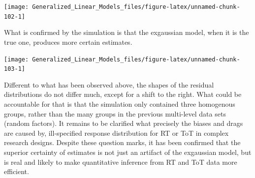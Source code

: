 \documentclass[]{svmono}
\newenvironment{Shaded}{\begin{snugshade}}{\end{snugshade}}
\newcommand{\KeywordTok}[1]{\textcolor[rgb]{0.13,0.29,0.53}{\textbf{#1}}}
\newcommand{\DataTypeTok}[1]{\textcolor[rgb]{0.13,0.29,0.53}{#1}}
\newcommand{\DecValTok}[1]{\textcolor[rgb]{0.00,0.00,0.81}{#1}}
\newcommand{\StringTok}[1]{\textcolor[rgb]{0.31,0.60,0.02}{#1}}
\newcommand{\OperatorTok}[1]{\textcolor[rgb]{0.81,0.36,0.00}{\textbf{#1}}}
\newcommand{\NormalTok}[1]{#1}
\begin{document}
\begin{Shaded}
\end{Shaded}

\texttt{[image: Generalized\_Linear\_Models\_files/figure-latex/unnamed-chunk-102-1]}

What is confirmed by the simulation is that the exgaussian model, when
it is the true one, produces more certain estimates.

\begin{Shaded}
\end{Shaded}

\texttt{[image: Generalized\_Linear\_Models\_files/figure-latex/unnamed-chunk-103-1]}

Different to what has been observed above, the shapes of the residual
distributions do not differ much, except for a shift to the right. What
could be accountable for that is that the simulation only contained
three homogenous groups, rather than the many groups in the previous
multi-level data sets (random factors). It remains to be clarified what
precisely the biases and drags are caused by, ill-specified response
distribution for RT or ToT in complex research designs. Despite these
question marks, it has been confirmed that the superior certainty of
estimates is not just an artifact of the exgaussian model, but is real
and likely to make quantitative inference from RT and ToT data more
efficient.
\end{document}
